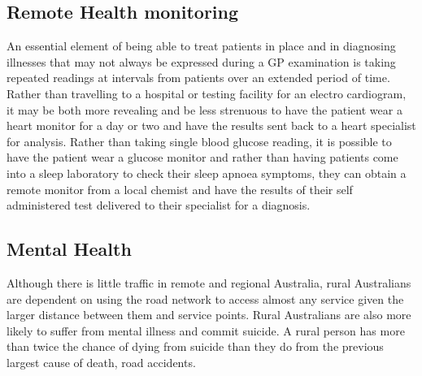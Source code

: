 \subsection{Remote Health monitoring}
An essential element of being able to treat patients in place and in diagnosing illnesses that may not always be expressed during a GP examination is taking repeated readings at intervals from patients over an extended period of time. Rather than travelling to a hospital or testing facility for an electro cardiogram, it may be both more revealing and be less strenuous to have the patient wear a heart monitor for a day or two and have the results sent back to a heart specialist for analysis. Rather than taking single blood glucose reading, it is possible to have the patient wear a glucose monitor and rather than having patients come into a sleep laboratory to check their sleep apnoea symptoms, they can obtain a remote monitor from a local chemist and have the results of their self administered test delivered to their specialist for a diagnosis\cite{ResMed2018}. 



\subsection{Mental Health}
Although there is little traffic in remote and regional Australia, rural Australians are dependent on using the road network to access almost any service given the larger distance between them and service points. Rural Australians are also more likely to suffer from mental illness and commit suicide. A rural person has more than twice the chance of dying from suicide than they do from the previous largest cause of death, road accidents. 

